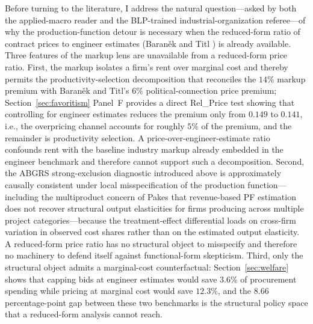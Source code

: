 \documentclass[11pt]{article}
\begin{document}
Before turning to the literature, I address the natural question---asked by both the applied-macro reader and the BLP-trained industrial-organization referee---of why the production-function detour is necessary when the reduced-form ratio of contract prices to engineer estimates (Baran\v{e}k and Titl \cite{BaranekTitl2024}) is already available. Three features of the markup lens are unavailable from a reduced-form price ratio. First, the markup isolates a firm's rent over marginal cost and thereby permits the productivity-selection decomposition that reconciles the $14\%$ markup premium with Baran\v{e}k and Titl's $6\%$ political-connection price premium; Section~\ref{sec:favoritism} Panel~F provides a direct Rel\_Price test showing that controlling for engineer estimates reduces the premium only from $0.149$ to $0.141$, i.e., the overpricing channel accounts for roughly $5\%$ of the premium, and the remainder is productivity selection. A price-over-engineer-estimate ratio confounds rent with the baseline industry markup already embedded in the engineer benchmark and therefore cannot support such a decomposition. Second, the ABGRS strong-exclusion diagnostic introduced above is approximately causally consistent under local misspecification of the production function---including the multiproduct concern of Pakes \cite{Pakes2021AnnRev} that revenue-based PF estimation does not recover structural output elasticities for firms producing across multiple project categories---because the treatment-effect differential loads on cross-firm variation in observed cost shares rather than on the estimated output elasticity. A reduced-form price ratio has no structural object to misspecify and therefore no machinery to defend itself against functional-form skepticism. Third, only the structural object admits a marginal-cost counterfactual: Section~\ref{sec:welfare} shows that capping bids at engineer estimates would save $3.6\%$ of procurement spending while pricing at marginal cost would save $12.3\%$, and the $8.66$ percentage-point gap between these two benchmarks is the structural policy space that a reduced-form analysis cannot reach.
\end{document}
